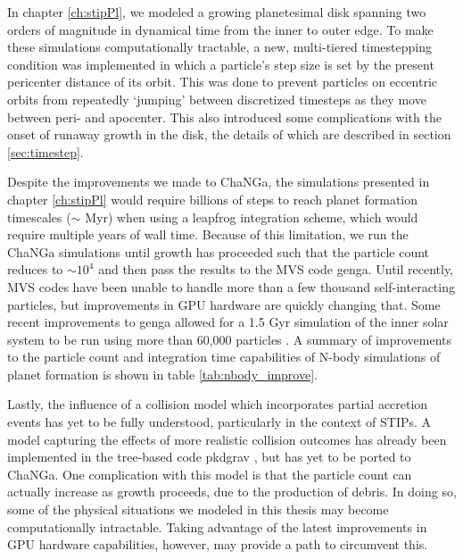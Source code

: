 In chapter \ref{ch:stipPl}, we modeled a growing planetesimal disk spanning two orders of magnitude in dynamical time from the inner to outer edge. To make these simulations computationally tractable, a new, multi-tiered timestepping condition was implemented in which a particle's step size is set by the present pericenter distance of its orbit. This was done to prevent particles on eccentric orbits from repeatedly `jumping' between discretized timesteps as they move between peri- and apocenter. This also introduced some complications with the onset of runaway growth in the disk, the details of which are described in section \ref{sec:timestep}.

Despite the improvements we made to {\sc ChaNGa}, the simulations presented in chapter \ref{ch:stipPl} would require billions of steps to reach planet formation timescales ($\sim$ Myr) when using a leapfrog integration scheme, which would require multiple years of wall time. Because of this limitation, we run the {\sc ChaNGa} simulations until growth has proceeded such that the particle count reduces to $\sim 10^{4}$ and then pass the results to the MVS code {\sc genga}. Until recently, MVS codes have been unable to handle more than a few thousand self-interacting particles, but improvements in GPU hardware are quickly changing that. Some recent improvements to {\sc genga} allowed for a 1.5 Gyr simulation of the inner solar system to be run using more than 60,000 particles \cite{grimm22}. A summary of improvements to the particle count and integration time capabilities of N-body simulations of planet formation is shown in table \ref{tab:nbody_improve}.

Lastly, the influence of a collision model which incorporates partial accretion events has yet to be fully understood, particularly in the context of STIPs. A model capturing the effects of more realistic collision outcomes has already been implemented in the tree-based code {\sc pkdgrav} \cite{leinhardt12, leinhardt15}, but has yet to be ported to {\sc ChaNGa}. One complication with this model is that the particle count can actually increase as growth proceeds, due to the production of debris. In doing so, some of the physical situations we modeled in this thesis may become computationally intractable. Taking advantage of the latest improvements in GPU hardware capabilities, however, may provide a path to circumvent this.

